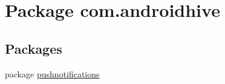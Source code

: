 \hypertarget{namespacecom_1_1androidhive}{\section{Package com.\-androidhive}
\label{namespacecom_1_1androidhive}
}
\subsection*{Packages}
\begin{DoxyCompactItemize}
\item 
package \hyperlink{namespacecom_1_1androidhive_1_1pushnotifications}{pushnotifications}
\end{DoxyCompactItemize}
